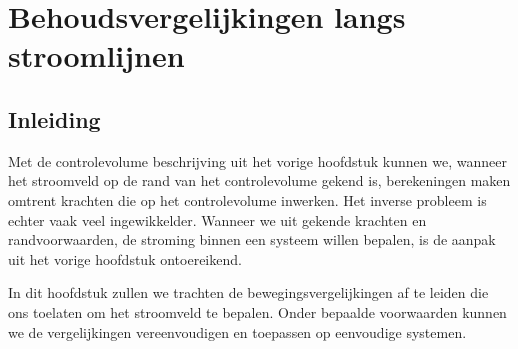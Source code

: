 \chapter{Behoudsvergelijkingen langs stroomlijnen}
\label{sec:Behoudsvergelijkingen langs stroomlijnen}

	\section{Inleiding}
	\label{sec:Behoudsvergelijkingen langs stroomlijnen inleiding}
Met de controlevolume beschrijving uit het vorige hoofdstuk kunnen we, wanneer het stroomveld op de rand van het controlevolume gekend is, berekeningen maken omtrent krachten die op het controlevolume inwerken. Het inverse probleem is echter vaak veel ingewikkelder. Wanneer we uit gekende krachten en randvoorwaarden, de stroming binnen een systeem willen bepalen, is de aanpak uit het vorige hoofdstuk ontoereikend.

In dit hoofdstuk zullen we trachten de bewegingsvergelijkingen af te leiden die ons toelaten om het stroomveld te bepalen. Onder bepaalde voorwaarden kunnen we de vergelijkingen vereenvoudigen en toepassen op eenvoudige systemen.

